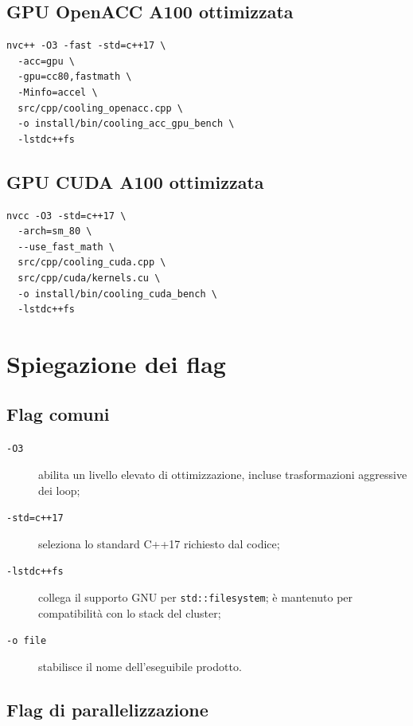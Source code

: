 \documentclass[11pt,a4paper]{article}
\begin{document}
\subsection{GPU OpenACC A100 ottimizzata}

\begin{lstlisting}[style=shell]
nvc++ -O3 -fast -std=c++17 \
  -acc=gpu \
  -gpu=cc80,fastmath \
  -Minfo=accel \
  src/cpp/cooling_openacc.cpp \
  -o install/bin/cooling_acc_gpu_bench \
  -lstdc++fs
\end{lstlisting}

\subsection{GPU CUDA A100 ottimizzata}

\begin{lstlisting}[style=shell]
nvcc -O3 -std=c++17 \
  -arch=sm_80 \
  --use_fast_math \
  src/cpp/cooling_cuda.cpp \
  src/cpp/cuda/kernels.cu \
  -o install/bin/cooling_cuda_bench \
  -lstdc++fs
\end{lstlisting}

\section{Spiegazione dei flag}

\subsection{Flag comuni}

\begin{description}
  \item[\texttt{-O3}] abilita un livello elevato di ottimizzazione, incluse
  trasformazioni aggressive dei loop;
  \item[\texttt{-std=c++17}] seleziona lo standard C++17 richiesto dal codice;
  \item[\texttt{-lstdc++fs}] collega il supporto GNU per
  \texttt{std::filesystem}; è mantenuto per compatibilità con lo stack del
  cluster;
  \item[\texttt{-o file}] stabilisce il nome dell'eseguibile prodotto.
\end{description}

\subsection{Flag di parallelizzazione}
\end{document}
